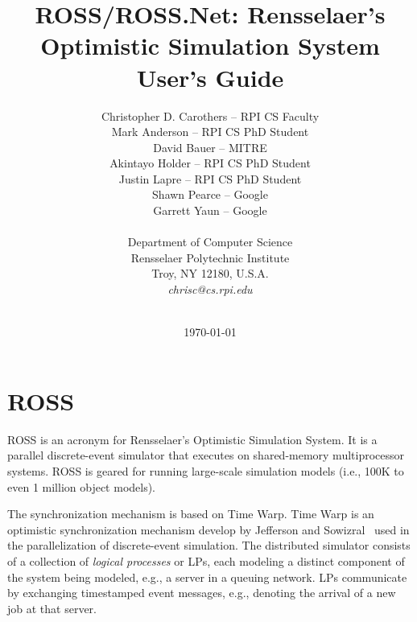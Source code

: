 \documentclass[12pt]{article}
\begin{document}

\title{ROSS/ROSS.Net: Rensselaer's Optimistic Simulation System\\ User's Guide}

\author{
 Christopher D. Carothers -- RPI CS Faculty  \\[12pt]
 Mark Anderson -- RPI CS PhD Student       \\
 David Bauer -- MITRE                      \\	
 Akintayo Holder -- RPI CS PhD Student     \\
 Justin Lapre -- RPI CS PhD Student        \\
 Shawn Pearce -- Google                    \\
 Garrett Yaun -- Google                    \\[12pt]
                                           \\
 Department of Computer Science \\
 Rensselaer Polytechnic Institute \\
 Troy, NY 12180, U.S.A.\\
 {\em chrisc@cs.rpi.edu}\\ \\
}

\date{\today}
\maketitle

\pagebreak

\tableofcontents

\pagebreak

\section{ROSS}
ROSS is an acronym for Rensselaer's Optimistic Simulation System.  It is a
parallel discrete-event simulator that executes on shared-memory
multiprocessor systems. ROSS is geared for running large-scale simulation
models (i.e., 100K to even 1 million object models).

The synchronization mechanism is based on Time Warp. Time Warp is an
optimistic synchronization mechanism develop by Jefferson and
Sowizral~\cite{jefferson-tr-82,jefferson-toplas-85} used in the
parallelization of discrete-event simulation. The distributed simulator
consists of a collection of {\em logical processes} or LPs, each modeling a
distinct component of the system being modeled, e.g., a server in a queuing
network.  LPs communicate by exchanging timestamped event messages, e.g.,
denoting the arrival of a new job at that server.
\end{document}
